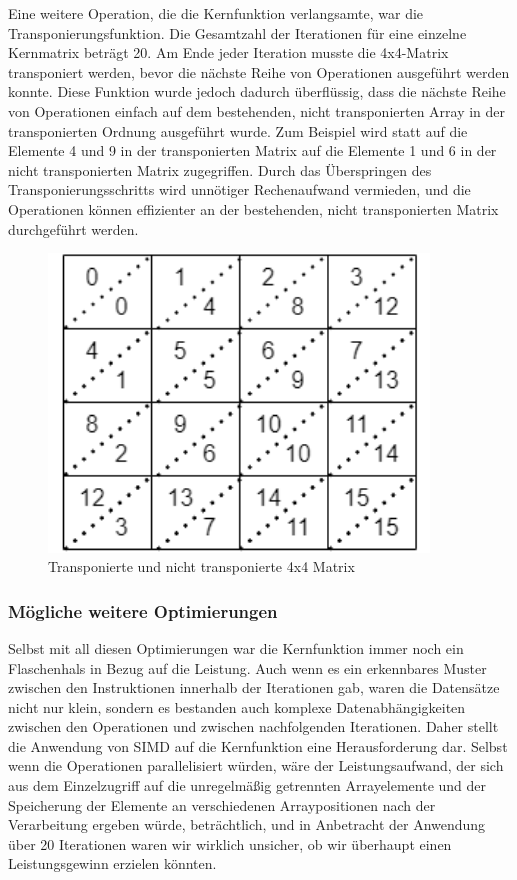 \documentclass[course=erap]{aspdoc}
\begin{document}
{{{{{{{{{{{{{{{{{Eine weitere Operation, die die Kernfunktion verlangsamte, war die Transponierungsfunktion. Die Gesamtzahl der Iterationen für eine einzelne Kernmatrix beträgt 20. Am Ende jeder Iteration musste die 4x4-Matrix transponiert werden, bevor die nächste Reihe von Operationen ausgeführt werden konnte. Diese Funktion wurde jedoch dadurch überflüssig, dass die nächste Reihe von Operationen einfach auf dem bestehenden, nicht transponierten Array in der transponierten Ordnung ausgeführt wurde. Zum Beispiel wird statt auf die Elemente 4 und 9 in der transponierten Matrix auf die Elemente 1 und 6 in der nicht transponierten Matrix zugegriffen.
Durch das Überspringen des Transponierungsschritts wird unnötiger Rechenaufwand vermieden, und die Operationen können effizienter an der bestehenden, nicht transponierten Matrix durchgeführt werden.

\begin{figure}[h] 
  \centering 
  \includegraphics[width=0.9\textwidth]{pictures/transpose.png} 
  \caption{Transponierte und nicht transponierte 4x4 Matrix } 
  \label{fig:my_label4}
\end{figure}

\subsubsection{Mögliche weitere Optimierungen}
Selbst mit all diesen Optimierungen war die Kernfunktion immer noch ein Flaschenhals in Bezug auf die Leistung. Auch wenn es ein erkennbares Muster zwischen den Instruktionen innerhalb der Iterationen gab, waren die Datensätze nicht nur klein, sondern es bestanden auch komplexe Datenabhängigkeiten zwischen den Operationen und zwischen nachfolgenden Iterationen. Daher stellt die Anwendung von SIMD auf die Kernfunktion eine Herausforderung dar. Selbst wenn die Operationen parallelisiert würden, wäre der Leistungsaufwand, der sich aus dem Einzelzugriff auf die unregelmäßig getrennten Arrayelemente und der Speicherung der Elemente an verschiedenen Arraypositionen nach der Verarbeitung ergeben würde, beträchtlich, und in Anbetracht der Anwendung über 20 Iterationen waren wir wirklich unsicher, ob wir überhaupt einen Leistungsgewinn erzielen könnten.

}}}}}}}}}}}}}}}}}
\end{document}
